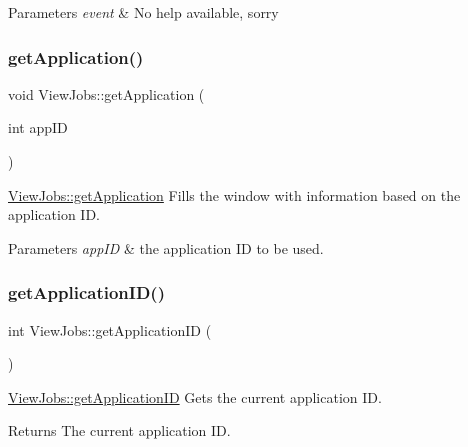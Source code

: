 \begin{DoxyParams}{Parameters}
{\em event} & No help available, sorry \\
\hline
\end{DoxyParams}
\mbox{\label{class_view_jobs_ae9c1c806aa1dd5082b38a1dc9cbec39e}} 
\subsubsection{\texorpdfstring{get\+Application()}{getApplication()}}
{\footnotesize\ttfamily void View\+Jobs\+::get\+Application (\begin{DoxyParamCaption}\item[{int}]{app\+ID }\end{DoxyParamCaption})}



\hyperlink{class_view_jobs_ae9c1c806aa1dd5082b38a1dc9cbec39e}{View\+Jobs\+::get\+Application} Fills the window with information based on the application ID. 


\begin{DoxyParams}{Parameters}
{\em app\+ID} & the application ID to be used. \\
\hline
\end{DoxyParams}
\mbox{\label{class_view_jobs_a086650882ad80acb4074cf697f8cddcb}} 
\subsubsection{\texorpdfstring{get\+Application\+I\+D()}{getApplicationID()}}
{\footnotesize\ttfamily int View\+Jobs\+::get\+Application\+ID (\begin{DoxyParamCaption}{ }\end{DoxyParamCaption})}



\hyperlink{class_view_jobs_a086650882ad80acb4074cf697f8cddcb}{View\+Jobs\+::get\+Application\+ID} Gets the current application ID. 

\begin{DoxyReturn}{Returns}
The current application ID. 
\end{DoxyReturn}
\mbox{\label{class_view_jobs_adcafeca350b21a033aa630e042ee7947}} 
